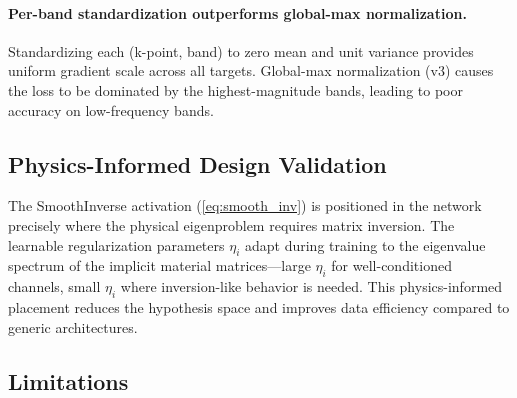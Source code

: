 \documentclass[11pt]{article}
\begin{document}
\paragraph{Per-band standardization outperforms global-max normalization.} Standardizing each (k-point, band) to zero mean and unit variance provides uniform gradient scale across all targets. Global-max normalization (v3) causes the loss to be dominated by the highest-magnitude bands, leading to poor accuracy on low-frequency bands.

\subsection{Physics-Informed Design Validation}

The SmoothInverse activation (\cref{eq:smooth_inv}) is positioned in the network precisely where the physical eigenproblem requires matrix inversion. The learnable regularization parameters $\eta_i$ adapt during training to the eigenvalue spectrum of the implicit material matrices---large $\eta_i$ for well-conditioned channels, small $\eta_i$ where inversion-like behavior is needed. This physics-informed placement reduces the hypothesis space and improves data efficiency compared to generic architectures.

\subsection{Limitations}
\end{document}
